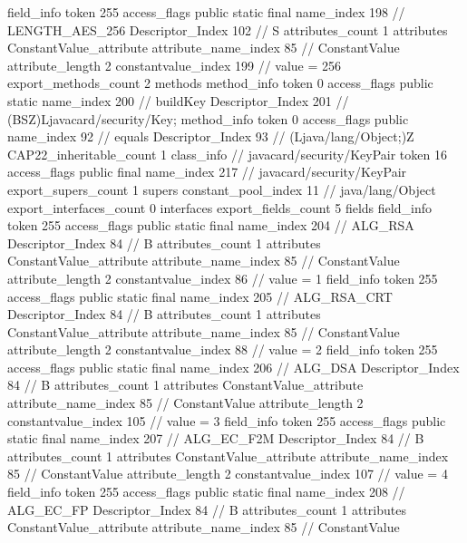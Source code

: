{{{{{{{				}
				}
			}
			field_info {
				token	255
				access_flags	public static final
				name_index	198		// LENGTH_AES_256
				Descriptor_Index	102		// S
				attributes_count	1
				attributes {
				ConstantValue_attribute {
					attribute_name_index	85		// ConstantValue
					attribute_length	2
					constantvalue_index	199		// value = 256
				}
				}
			}
			}
			export_methods_count	2
			methods {
				method_info {
					token	0
					access_flags	public static
					name_index	200		// buildKey
					Descriptor_Index	201		// (BSZ)Ljavacard/security/Key;
				}
				method_info {
					token	0
					access_flags	public
					name_index	92		// equals
					Descriptor_Index	93		// (Ljava/lang/Object;)Z
				}
			}
			CAP22_inheritable_count	1
		}
		class_info {		// javacard/security/KeyPair
			token	16
			access_flags	public final
			name_index	217		// javacard/security/KeyPair
			export_supers_count	1
			supers {
				constant_pool_index	11		// java/lang/Object
			}
			export_interfaces_count	0
			interfaces {
			}
			export_fields_count	5
			fields {
			field_info {
				token	255
				access_flags	public static final
				name_index	204		// ALG_RSA
				Descriptor_Index	84		// B
				attributes_count	1
				attributes {
				ConstantValue_attribute {
					attribute_name_index	85		// ConstantValue
					attribute_length	2
					constantvalue_index	86		// value = 1
				}
				}
			}
			field_info {
				token	255
				access_flags	public static final
				name_index	205		// ALG_RSA_CRT
				Descriptor_Index	84		// B
				attributes_count	1
				attributes {
				ConstantValue_attribute {
					attribute_name_index	85		// ConstantValue
					attribute_length	2
					constantvalue_index	88		// value = 2
				}
				}
			}
			field_info {
				token	255
				access_flags	public static final
				name_index	206		// ALG_DSA
				Descriptor_Index	84		// B
				attributes_count	1
				attributes {
				ConstantValue_attribute {
					attribute_name_index	85		// ConstantValue
					attribute_length	2
					constantvalue_index	105		// value = 3
				}
				}
			}
			field_info {
				token	255
				access_flags	public static final
				name_index	207		// ALG_EC_F2M
				Descriptor_Index	84		// B
				attributes_count	1
				attributes {
				ConstantValue_attribute {
					attribute_name_index	85		// ConstantValue
					attribute_length	2
					constantvalue_index	107		// value = 4
				}
				}
			}
			field_info {
				token	255
				access_flags	public static final
				name_index	208		// ALG_EC_FP
				Descriptor_Index	84		// B
				attributes_count	1
				attributes {
				ConstantValue_attribute {
					attribute_name_index	85		// ConstantValue
}}}}}}}

